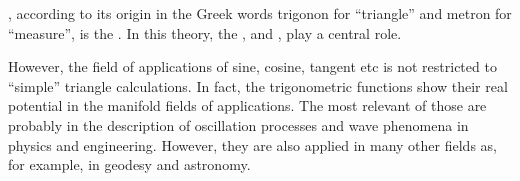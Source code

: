 \begin{MIntro}
 

, according to its origin in the Greek words trigonon for ``triangle'' and metron 
for ``measure'', is the . In this theory, 
the  ,  
and , play a central role. 

However, the field of applications of sine, cosine, tangent etc is not restricted 
to ``simple'' triangle calculations. In fact, the trigonometric functions show their real potential 
in the manifold fields of applications. The most relevant of those are probably in the description of 
oscillation processes and wave phenomena in physics and engineering. However, they are also applied 
in many other fields as, for example, in geodesy and astronomy.
 
\end{MIntro}

